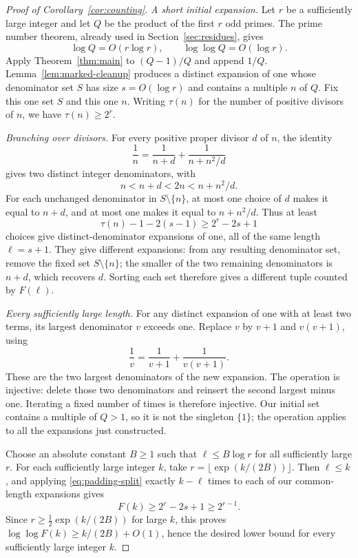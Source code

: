 \begin{proof}[Proof of Corollary~\ref{cor:counting}]
\emph{A short initial expansion.}
Let $r$ be a sufficiently large integer and let $Q$ be the product of
the first $r$ odd primes. The prime number theorem, already used in
Section~\ref{sec:residues}, gives
\[
 \log Q=O(r\log r),\qquad \log\log Q=O(\log r).
\]
Apply Theorem~\ref{thm:main} to $(Q-1)/Q$ and append $1/Q$.
Lemma~\ref{lem:marked-cleanup} produces a distinct expansion of one
whose denominator set $S$ has size $s=O(\log r)$ and contains a
multiple $n$ of $Q$. Fix this one set $S$ and this one $n$.
Writing $\tau(n)$ for the number of positive divisors of $n$, we have
$\tau(n)\ge 2^r$.

\emph{Branching over divisors.}
For every positive proper divisor $d$ of $n$, the identity
\begin{equation}\label{eq:divisor-split}
 \frac1n=\frac1{n+d}+\frac1{n+n^2/d}
\end{equation}
gives two distinct integer denominators, with
\[
 n<n+d<2n<n+n^2/d.
\]
For each unchanged denominator in $S\setminus\{n\}$, at most one
choice of $d$ makes it equal to $n+d$, and at most one makes it equal
to $n+n^2/d$. Thus at least
\[
 \tau(n)-1-2(s-1)\ge 2^r-2s+1
\]
choices give distinct-denominator expansions of one, all of the same
length $\ell=s+1$. They give different expansions: from any resulting
denominator set, remove the fixed set $S\setminus\{n\}$; the smaller
of the two remaining denominators is $n+d$, which recovers $d$.
Sorting each set therefore gives a different tuple counted by $F(\ell)$.

\emph{Every sufficiently large length.}
For any distinct expansion of one with at least two terms, its largest
denominator $v$ exceeds one. Replace $v$ by $v+1$ and $v(v+1)$, using
\begin{equation}\label{eq:padding-split}
 \frac1v=\frac1{v+1}+\frac1{v(v+1)}.
\end{equation}
These are the two largest denominators of the new expansion. The
operation is injective: delete those two denominators and reinsert
the second largest minus one. Iterating a fixed number of times is
therefore injective. Our initial set contains a multiple of $Q>1$,
so it is not the singleton $\{1\}$; the operation applies to all
the expansions just constructed.

Choose an absolute constant $B\ge1$ such that $\ell\le B\log r$ for
all sufficiently large $r$. For each sufficiently large integer $k$,
take $r=\lfloor\exp(k/(2B))\rfloor$. Then $\ell\le k$, and applying
\eqref{eq:padding-split} exactly $k-\ell$ times to each of our
common-length expansions gives
\[
 F(k)\ge 2^r-2s+1\ge 2^{r-1}.
\]
Since $r\ge\tfrac12\exp(k/(2B))$ for large $k$, this proves
$\log\log F(k)\ge k/(2B)+O(1)$, hence the desired lower bound
for every sufficiently large integer $k$.


\end{proof}
